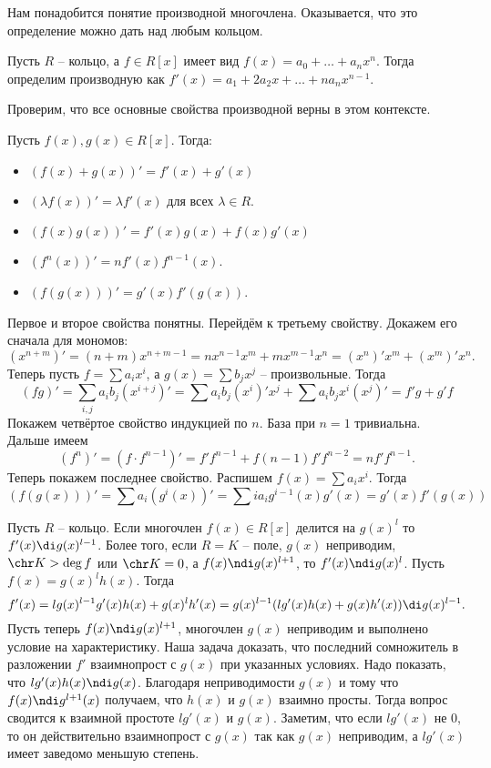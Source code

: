 Нам понадобится понятие производной многочлена. Оказывается, что это определение можно дать над любым кольцом. 

\dfn Пусть $R$ -- кольцо, а $f\in R[x] $ имеет вид $f(x)=a_0+\dots+a_nx^n$. Тогда определим производную как $f'(x)=a_1+2a_2x+\dots+na_nx^{n-1}$.
\edfn

Проверим, что все основные свойства производной верны в этом контексте.

\thrm[Свойства] Пусть $f(x),g(x) \in R[x]$. Тогда:
\begin{itemize}
\item $(f(x)+g(x))'= f'(x)+g'(x)$
\item $(\lambda f(x))'=\lambda f'(x)$ для всех $\lambda \in R$.
\item  $(f(x)g(x))'=f'(x)g(x)+f(x)g'(x)$
\item $(f^n(x))'=nf'(x)f^{n-1}(x)$.
\item $(f(g(x)))'=g'(x)f'(g(x))$.
\end{itemize}
\ethrm
\proof Первое и второе свойства понятны. Перейдём к третьему свойству. Докажем его сначала для мономов:
$$(x^{n+m})'=(n+m)x^{n+m-1}=nx^{n-1}x^{m}+mx^{m-1}x^n=(x^n)'x^m+(x^{m})'x^n.$$
Теперь пусть $f=\sum a_i x^i$, а $g(x)=\sum b_j x^j$ -- произвольные. Тогда 
$$(fg)'= 
\sum_{i,j} a_ib_j (x^{i+j})'= \sum a_ib_j (x^i)'x^j + \sum a_ib_j x^i(x^j)'=f'g+g'f$$ 
Покажем четвёртое свойство индукцией по $n$. База при $n=1$ тривиальна. Дальше имеем 
$$(f^n)'=(f\cdot f^{n-1})'=f'f^{n-1}+f(n-1)f'f^{n-2}=nf'f^{n-1}.$$
Теперь покажем последнее свойство. Распишем $f(x)=\sum a_i x^i$. Тогда $$(f(g(x)))'=\sum a_i (g^i(x))'= \sum i a_i g^{i-1}(x) g'(x)= g'(x) f'(g(x))$$


\endproof

\thrm Пусть $R$ -- кольцо. Если многочлен $f(x) \in R[x]$ делится на $g(x)^l$ то $f'(x) \di g(x)^{l-1}$. Более того, если $R=K$ -- поле, $g(x)$ неприводим, $\chr K > \deg f$ или $\chr K=0$, а $f(x) \ndi g(x)^{l+1}$, то $f'(x)\ndi g(x)^{l}$.
\ethrm
\proof Пусть $f(x)=g(x)^lh(x)$. Тогда $$f'(x)=lg(x)^{l-1}g'(x)h(x)+g(x)^lh'(x)=g(x)^{l-1}(lg'(x)h(x)+g(x)h'(x)) \di g(x)^{l-1}.$$
Пусть теперь $f(x) \ndi g(x)^{l+1}$, многочлен $g(x)$ неприводим и выполнено условие на характеристику. Наша задача доказать, что последний сомножитель в разложении $f'$ взаимнопрост с $g(x)$ при указанных условиях. Надо показать, что $lg'(x)h(x)\ndi g(x)$. Благодаря неприводимости $g(x)$  и тому что $f(x)\ndi g^{l+1}(x)$ получаем, что $h(x)$ и $g(x)$ взаимно просты.   Тогда вопрос сводится к взаимной простоте $lg'(x)$ и $g(x)$. Заметим, что если $lg'(x)$ не 0, то он действительно взаимнопрост с $g(x)$ так как $g(x)$ неприводим, а $lg'(x)$ имеет заведомо меньшую степень. 

